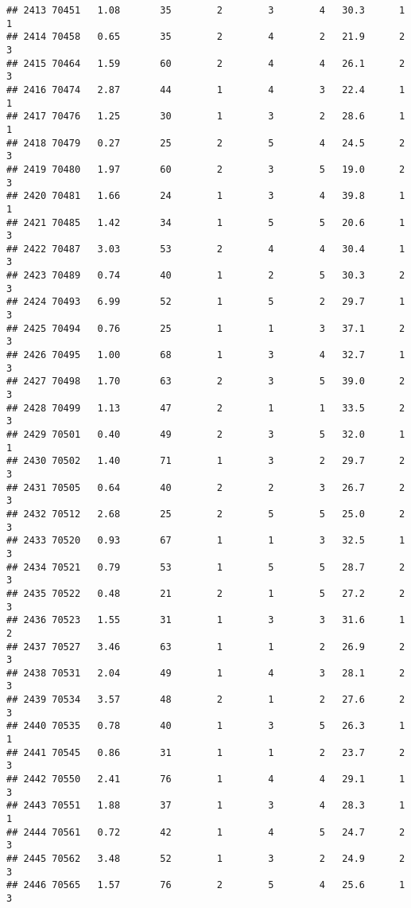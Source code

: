 \documentclass[
]{article}
\begin{document}
\begin{verbatim}
## 2413 70451   1.08       35        2        3        4   30.3      1      1
## 2414 70458   0.65       35        2        4        2   21.9      2      3
## 2415 70464   1.59       60        2        4        4   26.1      2      3
## 2416 70474   2.87       44        1        4        3   22.4      1      1
## 2417 70476   1.25       30        1        3        2   28.6      1      1
## 2418 70479   0.27       25        2        5        4   24.5      2      3
## 2419 70480   1.97       60        2        3        5   19.0      2      3
## 2420 70481   1.66       24        1        3        4   39.8      1      1
## 2421 70485   1.42       34        1        5        5   20.6      1      3
## 2422 70487   3.03       53        2        4        4   30.4      1      3
## 2423 70489   0.74       40        1        2        5   30.3      2      3
## 2424 70493   6.99       52        1        5        2   29.7      1      3
## 2425 70494   0.76       25        1        1        3   37.1      2      3
## 2426 70495   1.00       68        1        3        4   32.7      1      3
## 2427 70498   1.70       63        2        3        5   39.0      2      3
## 2428 70499   1.13       47        2        1        1   33.5      2      3
## 2429 70501   0.40       49        2        3        5   32.0      1      1
## 2430 70502   1.40       71        1        3        2   29.7      2      3
## 2431 70505   0.64       40        2        2        3   26.7      2      3
## 2432 70512   2.68       25        2        5        5   25.0      2      3
## 2433 70520   0.93       67        1        1        3   32.5      1      3
## 2434 70521   0.79       53        1        5        5   28.7      2      3
## 2435 70522   0.48       21        2        1        5   27.2      2      3
## 2436 70523   1.55       31        1        3        3   31.6      1      2
## 2437 70527   3.46       63        1        1        2   26.9      2      3
## 2438 70531   2.04       49        1        4        3   28.1      2      3
## 2439 70534   3.57       48        2        1        2   27.6      2      3
## 2440 70535   0.78       40        1        3        5   26.3      1      1
## 2441 70545   0.86       31        1        1        2   23.7      2      3
## 2442 70550   2.41       76        1        4        4   29.1      1      3
## 2443 70551   1.88       37        1        3        4   28.3      1      1
## 2444 70561   0.72       42        1        4        5   24.7      2      3
## 2445 70562   3.48       52        1        3        2   24.9      2      3
## 2446 70565   1.57       76        2        5        4   25.6      1      3

\end{verbatim}
\end{document}
